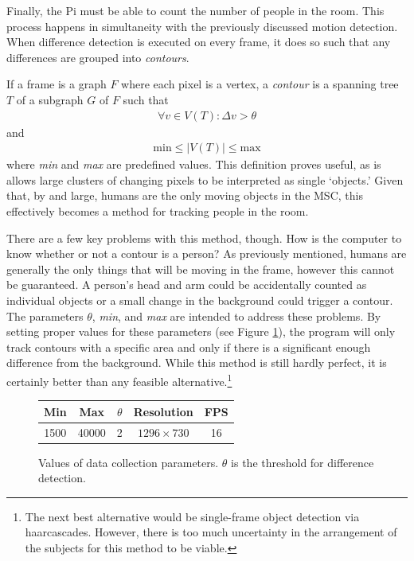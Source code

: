 Finally, the Pi must be able to count the number of people in the room. This process happens in simultaneity with the previously discussed motion detection. When difference detection is executed on every frame, it does so such that any differences are grouped into \textit{contours}.

If a frame is a graph $F$ where each pixel is a vertex, a \textit{contour} is a spanning tree $T$ of a subgraph $G$ of $F$ such that
\begin{gather}
    \forall v \in V(T) : \Delta v > \theta
\end{gather}
and
\begin{gather}
    \text{min} \leq \left | V(T) \right | \leq \text{max}
\end{gather}
where \textit{min} and \textit{max} are predefined values. This definition proves useful, as is allows large clusters of changing pixels to be interpreted as single `objects.' Given that, by and large, humans are the only moving objects in the MSC, this effectively becomes a method for tracking people in the room.

There are a few key problems with this method, though. How is the computer to know whether or not a contour is a person? As previously mentioned, humans are generally the only things that will be moving in the frame, however this cannot be guaranteed. A person's head and arm could be accidentally counted as individual objects or a small change in the background could trigger a contour. The parameters $\theta$, \textit{min}, and \textit{max} are intended to address these problems. By setting proper values for these parameters (see Figure \ref{fig:params}), the program will only track contours with a specific area and only if there is a significant enough difference from the background. While this method is still hardly perfect, it is certainly better than any feasible alternative.\footnote{The next best alternative would be single-frame object detection via haarcascades. However, there is too much uncertainty in the arrangement of the subjects for this method to be viable.}

\begin{figure}[t]
    \centering
    \begin{tabular}{c|c|c|c|c}
    \hline 
    \hline
        \textbf{Min} & \textbf{Max} & $\theta$ & \textbf{Resolution} & \textbf{FPS}  \\
        \hline 
        1500 & 40000 & 2 & $1296 \times 730$ & 16 \\
        \hline 
        \hline
    \end{tabular}
    \caption{Values of data collection parameters. $\theta$ is the threshold for difference detection.}
    \label{fig:params}
\end{figure}

